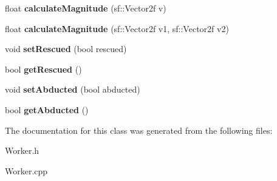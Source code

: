 \begin{DoxyCompactItemize}
$$float {\bfseries calculate\+Magnitude} (sf\+::\+Vector2f v)
\item 
\mbox{\label{class_worker_a00fc71b506eeeef4c431c40145057306}} 
float {\bfseries calculate\+Magnitude} (sf\+::\+Vector2f v1, sf\+::\+Vector2f v2)
\item 
\mbox{\label{class_worker_a6bbf4cf7f718e3055f3fdc62a9482c58}} 
void {\bfseries set\+Rescued} (bool rescued)
\item 
\mbox{\label{class_worker_afe18a64d13904bf62f2b27b21ff1fc67}} 
bool {\bfseries get\+Rescued} ()
\item 
\mbox{\label{class_worker_a5e424fc42047b6b246f140c6c6190d29}} 
void {\bfseries set\+Abducted} (bool abducted)
\item 
\mbox{\label{class_worker_acae6aa29c48a0da9b274cba3eb083319}} 
bool {\bfseries get\+Abducted} ()
\end{DoxyCompactItemize}


The documentation for this class was generated from the following files\+:\begin{DoxyCompactItemize}
\item 
Worker.\+h\item 
Worker.\+cpp\end{DoxyCompactItemize}

